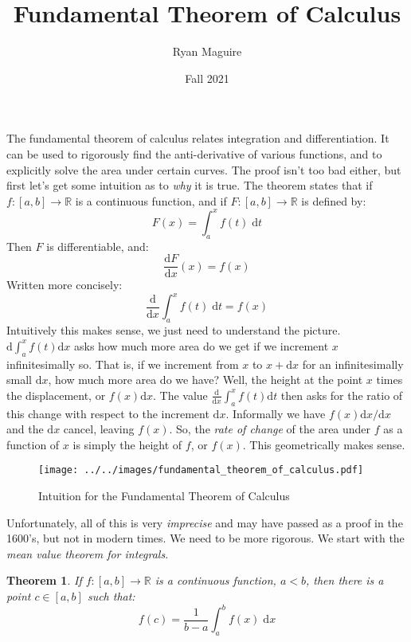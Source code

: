 \documentclass{article}
\title{Fundamental Theorem of Calculus}
\author{Ryan Maguire}
\date{Fall 2021}
\theoremstyle{normal}
\theoremstyle{plain}
\newtheorem{theorem}{Theorem}
\begin{document}
    \maketitle
    The fundamental theorem of calculus relates integration and differentiation.
    It can be used to rigorously find the anti-derivative of various functions,
    and to explicitly solve the area under certain curves. The proof isn't too
    bad either, but first let's get some intuition as to \textit{why} it is
    true. The theorem states that if $f:[a,b]\rightarrow\mathbb{R}$ is a
    continuous function, and if $F:[a,b]\rightarrow\mathbb{R}$ is defined by:
    \begin{equation}
        F(x)=\int_{a}^{x}f(t)\;\textrm{d}t
    \end{equation}
    Then $F$ is differentiable, and:
    \begin{equation}
        \frac{\textrm{d}F}{\textrm{d}x}(x)=f(x)
    \end{equation}
    Written more concisely:
    \begin{equation}
        \frac{\textrm{d}}{\textrm{d}x}\int_{a}^{x}f(t)\;\textrm{d}t=f(x)
    \end{equation}
    Intuitively this makes sense, we just need to understand the picture.
    $\textrm{d}\int_{a}^{x}f(t)\textrm{d}x$ asks how much more
    area do we get if we increment $x$ infinitesimally so. That is, if we
    increment from $x$ to $x+\textrm{d}x$ for an infinitesimally small
    $\textrm{d}x$, how much more area do we have? Well, the height at the point
    $x$ times the displacement, or $f(x)\textrm{d}x$. The value
    $\frac{\textrm{d}}{\textrm{d}x}\int_{a}^{x}f(t)\textrm{d}t$ then asks for
    the ratio of this change with respect to the increment $\textrm{d}x$.
    Informally we have $f(x)\textrm{d}x/\textrm{d}x$ and the $\textrm{d}x$
    cancel, leaving $f(x)$. So, the \textit{rate of change} of the area under
    $f$ as a function of $x$ is simply the height of $f$, or $f(x)$. This
    geometrically makes sense.
    \begin{figure}[H]
        \centering
        \texttt{[image: ../../images/fundamental\_theorem\_of\_calculus.pdf]}
        \caption{Intuition for the Fundamental Theorem of Calculus}
    \end{figure}
    Unfortunately, all of this is very
    \textit{imprecise} and may have passed as a proof in the 1600's, but not
    in modern times. We need to be more rigorous. We start with the
    \textit{mean value theorem for integrals}.
    \begin{theorem}
        If $f:[a,b]\rightarrow\mathbb{R}$ is a continuous function, $a<b$,
        then there is a point $c\in[a,b]$ such that:
        \begin{equation}
            f(c)=\frac{1}{b-a}\int_{a}^{b}f(x)\;\textrm{d}x
        \end{equation}
    \end{theorem}
\end{document}
